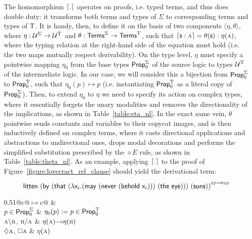 The homomorphism $\lceil{.}\rceil$ operates on proofs, i.e. typed terms, and thus does double duty: it transforms both terms and types of $\Sigma$ to corresponding terms and types of $\mathrm{T}$.
It is handy, then, to define it on the basis of two components $\langle \eta, \theta \rangle$, where $\eta : \mathcal{U}^{\Sigma} \to \mathcal{U}^{\mathrm{T}}$ and $\theta: \mathsf{Terms}^{\Sigma} \to \mathsf{Terms}^{\mathrm{T}}$, such that $\lceil{\ensuremath{\mathsf{s}}: \ensuremath{\normalfont\textsc{a}}}\rceil = \theta({\mathsf{s}}) : \eta({\normalfont\textsc{a}})$, where the typing relation at the right-hand side of the equation must hold (i.e. the two maps mutually respect derivability).
On the type level, $\eta$ must specify a pointwise mapping $\eta_0$ from the base types $\mathsf{Prop}_0^{\Sigma}$ of the source logic to types $\mathcal{U}^{\mathrm{T}}$ of the intermediate logic.
In our case, we will consider this a bijection from $\mathsf{Prop}_0^{\Sigma}$ to $\mathsf{Prop}_0^{\mathrm{T}}$, such that $\eta_0(p) \mapsto p$ (i.e. instantiating $\mathsf{Prop}_0^{\mathrm{T}}$ as a literal copy of $\mathsf{Prop}_0^{\Sigma}$).
Then, to extend $\eta_0$ to $\eta$ we need to specify its action on complex types, where it essentially forgets the unary modalities and removes the directionality of the implications, as shown in Table~\ref{table:eta_nl}.
In the exact same vein, $\theta$ pointwise sends constants and variables to their copycat images, and is then inductively defined on complex terms, where it casts directional applications and abstractions to undirectional ones, drops modal decorations and performs the simplified substitution prescribed by the $\diamond E$ rule, as shown in Table~\ref{table:theta_nl}.
As an example, applying $\lceil{.}\rceil$ to the proof of Figure~\ref{figure:lovecract_rel_clause} should yield the derivational term:
\begin{equation}\label{equation:litten_derterm}
\term{litten~(by~(that~(\lam \vari .(may~(never~(behold~\vari )))~(the~eye)))~(suns))}^{\prop{np}\li\prop{np}}
\end{equation}

\begin{table}[ht]
\begin{center}
	\begin{tabularx}{0.51\textwidth}{@{}c@{\quad$\mapsto$\quad}c@{}}
		 & \\
		\toprule
		$p \in \mathsf{Prop}_0^{\Sigma}$							& $\eta_0(p) := p \in \mathsf{Prop}_0^{\mathrm{T}}$\\
		$\normalfont\textsc{a}\backslash\normalfont\textsc{b}$,		
		$\normalfont\textsc{b}/\normalfont\textsc{a}$				& $\eta(\smallprop{a})\li\eta(\smallprop{b})$\\
		$\diamond\smallprop{a}$, 	$\bx\smallprop{a}$		& $\eta(\normalfont\textsc{a})$
	\end{tabularx}
	\caption{Translating $\NL_{\diamond,\bx}$ types to $\ILL_{\li}$.}
	\label{table:eta_nl}
\end{center}
\end{table}

